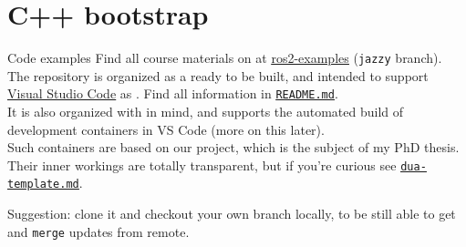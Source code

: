 
\section{C++ bootstrap}
\graphicspath{{figs/section2/}}

\begin{frame}{Code examples}
	Find all course materials on  at \href{https://github.com/IntelligentSystemsLabUTV/ros2-examples}{\color{blue}\underline{ros2-examples}} (\texttt{jazzy} branch).\\
	\bigskip
	The repository is organized as a  ready to be built, and intended to support \href{https://code.visualstudio.com/}{\color{blue}\underline{Visual Studio Code}} as . Find all information in \href{https://github.com/IntelligentSystemsLabUTV/ros2-examples/blob/jazzy/README.md}{\color{blue}\underline{\texttt{README.md}}}.\\
	\bigskip
	It is also organized with  in mind, and supports the automated build of development containers in VS Code (more on this later).\\
	Such containers are based on our \href{https://github.com/dotX-Automation/dua-template}{} project, which is the subject of my PhD thesis.\\
	Their inner workings are totally transparent, but if you're curious see \href{https://github.com/IntelligentSystemsLabUTV/ros2-examples/blob/jazzy/dua-template.md}{\color{blue}\underline{\texttt{dua-template.md}}}.
	\begin{block}{}
		\centering
		Suggestion: clone it and checkout your own branch locally, to be still able to get and \texttt{merge} updates from remote.
	\end{block}
\end{frame}

